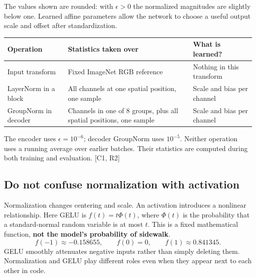 \documentclass[11pt,letterpaper]{article}
\begin{document}
\begin{center}
\end{center}
The values shown are rounded: with $\epsilon>0$ the normalized magnitudes are slightly below one. Learned affine parameters allow the network to choose a useful output scale and offset after standardization.

\begin{tabularx}{\linewidth}{@{}lYY@{}}\toprule
\textbf{Operation} & \textbf{Statistics taken over} & \textbf{What is learned?}\\\midrule
Input transform & Fixed ImageNet RGB reference & Nothing in this transform\\
LayerNorm in a block & All channels at one spatial position, one sample & Scale and bias per channel\\
GroupNorm in decoder & Channels in one of 8 groups, plus all spatial positions, one sample & Scale and bias per channel\\\bottomrule
\end{tabularx}
The encoder uses $\epsilon=10^{-6}$; decoder GroupNorm uses $10^{-5}$. Neither operation uses a running average over earlier batches. Their statistics are computed during both training and evaluation. [C1, R2]

\subsection*{Do not confuse normalization with activation}
Normalization changes centering and scale. An activation introduces a nonlinear relationship. Here GELU is $f(t)=t\Phi(t)$, where $\Phi(t)$ is the probability that a standard-normal random variable is at most $t$. This is a fixed mathematical function, \textbf{not the model's probability of sidewalk}.
\[
f(-1)\approx-0.158655,\qquad f(0)=0,\qquad f(1)\approx0.841345.
\]
GELU smoothly attenuates negative inputs rather than simply deleting them. Normalization and GELU play different roles even when they appear next to each other in code.
\end{document}
